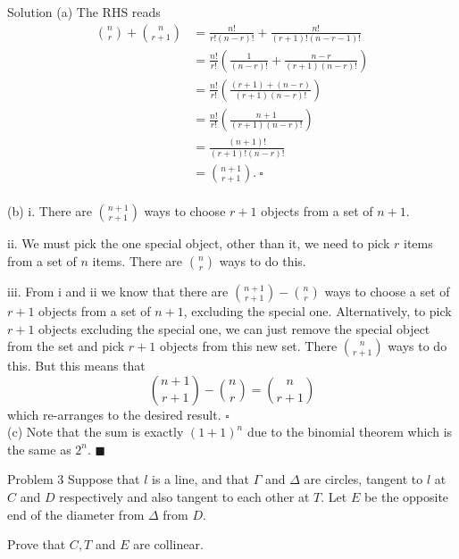 \documentclass{article}
\begin{document}
\begin{solution}{Solution}
(a) The RHS reads
\[
\begin{aligned}
\binom{n}{r} + \binom{n}{r+1} &= \frac{n!}{r!(n-r)!} +
\frac{n!}{(r+1)!(n-r-1)!}\\
&= \frac{n!}{r!} \left( \frac{1}{(n-r)!} + \frac{n-r}{(r+1)(n-r)!} \right)\\
&= \frac{n!}{r!} \left( \frac{(r+1) + (n-r)}{(r+1)(n-r)!} \right)\\
&= \frac{n!}{r!} \left( \frac{n+1}{(r+1)(n-r)!} \right)\\
&= \frac{(n+1)!}{(r+1)!(n-r)!}\\
&= \binom{n+1}{r+1}. \ \square
\end{aligned}
\]
\\

(b) i. There are $\binom{n+1}{r+1}$ ways to choose $r+1$ objects from a set
of $n+1$.
\vspace{0.2cm}

ii. We must pick the one special object, other than it, we need to pick
$r$ items from a set of $n$ items. There are $\binom{n}{r}$ ways to do this.
\vspace{0.2cm}

iii. From i and ii we know that there are $\binom{n+1}{r+1} - \binom{n}{r}$
ways to choose a set of $r+1$ objects from a set of $n+1$, excluding the
special one. Alternatively, to pick $r+1$ objects excluding the special one,
we can just remove the special object from the
set and pick $r+1$ objects from this new set. There $\binom{n}{r+1}$ ways
to do this. But this means that
$$
\binom{n+1}{r+1} - \binom{n}{r} = \binom{n}{r+1}
$$
which re-arranges to the desired result. $\square$
\\

(c) Note that the sum is exactly $(1+1)^n$ due to the binomial theorem
which is the same as $2^n$. $\blacksquare$
\end{solution}
\newpage

\begin{problem}{Problem 3}
Suppose that $l$ is a line, and that $\Gamma$ and $\Delta$ are circles,
tangent to $l$ at $C$ and $D$ respectively and also tangent to each other
at $T$. Let $E$ be the opposite end of the diameter from $\Delta$ from $D$.
\vspace{0.2cm}

Prove that $C, T$ and $E$ are collinear.
\end{problem}
\end{document}
